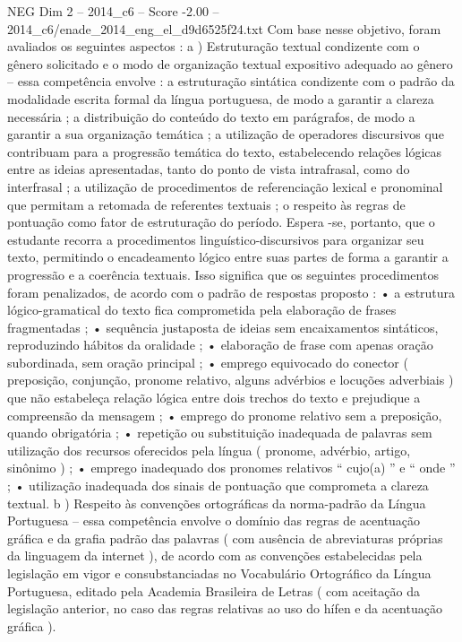 \begin{textsample}{NEG Dim 2 – 2014\_c6 – Score -2.00 – 2014\_c6/enade\_2014\_eng\_el\_d9d6525f24.txt}
Com base nesse objetivo, foram avaliados os seguintes aspectos : a ) Estruturação textual condizente com o gênero solicitado e o modo de organização textual expositivo adequado ao gênero – essa competência envolve : a estruturação sintática condizente com o padrão da modalidade escrita formal da língua portuguesa, de modo a garantir a clareza necessária ; a distribuição do conteúdo do texto em parágrafos, de modo a garantir a sua organização temática ; a utilização de operadores discursivos que contribuam para a progressão temática do texto, estabelecendo relações lógicas entre as ideias apresentadas, tanto do ponto de vista intrafrasal, como do interfrasal ; a utilização de procedimentos de referenciação lexical e pronominal que permitam a retomada de referentes textuais ; o respeito às regras de pontuação como fator de estruturação do período.
Espera -se, portanto, que o estudante recorra a procedimentos linguístico-discursivos para organizar seu texto, permitindo o encadeamento lógico entre suas partes de forma a garantir a progressão e a coerência textuais.
Isso significa que os seguintes procedimentos foram penalizados, de acordo com o padrão de respostas proposto : • a estrutura lógico-gramatical do texto fica comprometida pela elaboração de frases fragmentadas ; • sequência justaposta de ideias sem encaixamentos sintáticos, reproduzindo hábitos da oralidade ; • elaboração de frase com apenas oração subordinada, sem oração principal ; • emprego equivocado do conector ( preposição, conjunção, pronome relativo, alguns advérbios e locuções adverbiais ) que não estabeleça relação lógica entre dois trechos do texto e prejudique a compreensão da mensagem ; • emprego do pronome relativo sem a preposição, quando obrigatória ; • repetição ou substituição inadequada de palavras sem utilização dos recursos oferecidos pela língua ( pronome, advérbio, artigo, sinônimo ) ; • emprego inadequado dos pronomes relativos “ cujo(a) ” e “ onde ” ; • utilização inadequada dos sinais de pontuação que comprometa a clareza textual. b ) Respeito às convenções ortográficas da norma-padrão da Língua Portuguesa – essa competência envolve o domínio das regras de acentuação gráfica e da grafia padrão das palavras ( com ausência de abreviaturas próprias da linguagem da internet ), de acordo com as convenções estabelecidas pela legislação em vigor e consubstanciadas no Vocabulário Ortográfico da Língua Portuguesa, editado pela Academia Brasileira de Letras ( com aceitação da legislação anterior, no caso das regras relativas ao uso do hífen e da acentuação gráfica ).

\end{textsample}

